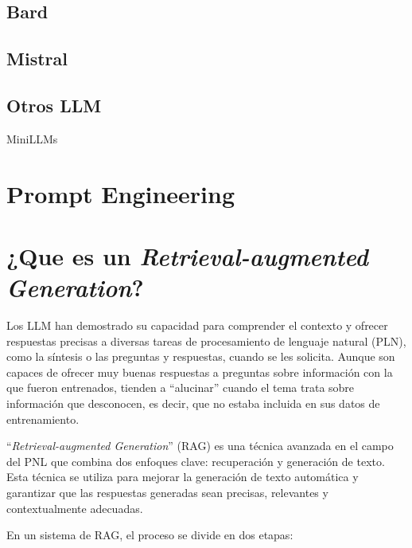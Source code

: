 \cite{Murtuza}


\subsection{Bard}

\subsection{Mistral}

\cite{Zhong2023AGIEvalAH}

\subsection{Otros LLM}

MiniLLMs

\section{Prompt Engineering}

\section{¿Que es un \textit{Retrieval-augmented Generation}?}

Los LLM han demostrado su capacidad para comprender el contexto y ofrecer respuestas precisas a diversas tareas de procesamiento de lenguaje natural (PLN), como la síntesis o las preguntas y respuestas, cuando se les solicita. Aunque son capaces de ofrecer muy buenas respuestas a preguntas sobre información con la que fueron entrenados, tienden a ``alucinar'' cuando el tema trata sobre información que desconocen, es decir, que no estaba incluida en sus datos de entrenamiento.

``\textit{Retrieval-augmented Generation}'' (RAG) es una técnica avanzada en el campo del PNL que combina dos enfoques clave: recuperación y generación de texto. Esta técnica se utiliza para mejorar la generación de texto automática y garantizar que las respuestas generadas sean precisas, relevantes y contextualmente adecuadas\cite{Lewis2020}.

En un sistema de RAG, el proceso se divide en dos etapas:

